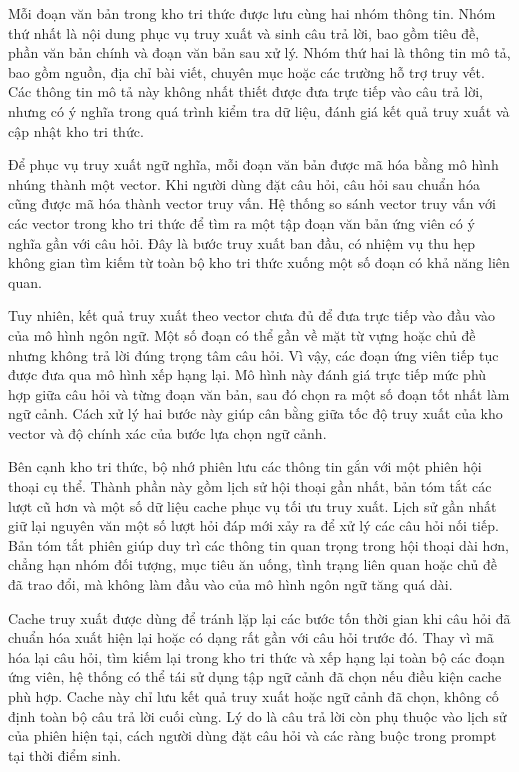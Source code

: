 \documentclass[a4paper,13pt,twoside]{report}
\begin{document}
Mỗi đoạn văn bản trong kho tri thức được lưu cùng hai nhóm thông tin. Nhóm thứ nhất là nội dung phục vụ truy xuất và sinh câu trả lời, bao gồm tiêu đề, phần văn bản chính và đoạn văn bản sau xử lý. Nhóm thứ hai là thông tin mô tả, bao gồm nguồn, địa chỉ bài viết, chuyên mục hoặc các trường hỗ trợ truy vết. Các thông tin mô tả này không nhất thiết được đưa trực tiếp vào câu trả lời, nhưng có ý nghĩa trong quá trình kiểm tra dữ liệu, đánh giá kết quả truy xuất và cập nhật kho tri thức.

Để phục vụ truy xuất ngữ nghĩa, mỗi đoạn văn bản được mã hóa bằng mô hình nhúng thành một vector. Khi người dùng đặt câu hỏi, câu hỏi sau chuẩn hóa cũng được mã hóa thành vector truy vấn. Hệ thống so sánh vector truy vấn với các vector trong kho tri thức để tìm ra một tập đoạn văn bản ứng viên có ý nghĩa gần với câu hỏi. Đây là bước truy xuất ban đầu, có nhiệm vụ thu hẹp không gian tìm kiếm từ toàn bộ kho tri thức xuống một số đoạn có khả năng liên quan.

Tuy nhiên, kết quả truy xuất theo vector chưa đủ để đưa trực tiếp vào đầu vào của mô hình ngôn ngữ. Một số đoạn có thể gần về mặt từ vựng hoặc chủ đề nhưng không trả lời đúng trọng tâm câu hỏi. Vì vậy, các đoạn ứng viên tiếp tục được đưa qua mô hình xếp hạng lại. Mô hình này đánh giá trực tiếp mức phù hợp giữa câu hỏi và từng đoạn văn bản, sau đó chọn ra một số đoạn tốt nhất làm ngữ cảnh. Cách xử lý hai bước này giúp cân bằng giữa tốc độ truy xuất của kho vector và độ chính xác của bước lựa chọn ngữ cảnh.

Bên cạnh kho tri thức, bộ nhớ phiên lưu các thông tin gắn với một phiên hội thoại cụ thể. Thành phần này gồm lịch sử hội thoại gần nhất, bản tóm tắt các lượt cũ hơn và một số dữ liệu cache phục vụ tối ưu truy xuất. Lịch sử gần nhất giữ lại nguyên văn một số lượt hỏi đáp mới xảy ra để xử lý các câu hỏi nối tiếp. Bản tóm tắt phiên giúp duy trì các thông tin quan trọng trong hội thoại dài hơn, chẳng hạn nhóm đối tượng, mục tiêu ăn uống, tình trạng liên quan hoặc chủ đề đã trao đổi, mà không làm đầu vào của mô hình ngôn ngữ tăng quá dài.

Cache truy xuất được dùng để tránh lặp lại các bước tốn thời gian khi câu hỏi đã chuẩn hóa xuất hiện lại hoặc có dạng rất gần với câu hỏi trước đó. Thay vì mã hóa lại câu hỏi, tìm kiếm lại trong kho tri thức và xếp hạng lại toàn bộ các đoạn ứng viên, hệ thống có thể tái sử dụng tập ngữ cảnh đã chọn nếu điều kiện cache phù hợp. Cache này chỉ lưu kết quả truy xuất hoặc ngữ cảnh đã chọn, không cố định toàn bộ câu trả lời cuối cùng. Lý do là câu trả lời còn phụ thuộc vào lịch sử của phiên hiện tại, cách người dùng đặt câu hỏi và các ràng buộc trong prompt tại thời điểm sinh.
\end{document}
